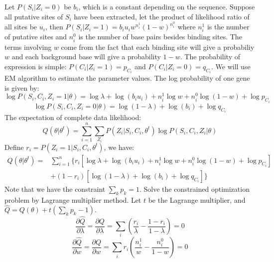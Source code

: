 \documentclass[11pt]{article}
\begin{document}
\begin{enumerate}
\begin{enumerate}
Let $P(S_i | Z_i =0)$ be $b_i$, which is a constant depending on the sequence. Suppose all putative sites of $S_i$ have been extracted, let the product of likelihood ratio of all sites be $u_i$, then $P(S_i|Z_i=1) = b_i u_i w^{n_i^1} (1 -w)^{n_i^0}$ where $n_i^1$ is the number of putative sites and $n_i^0$ is the number of base pairs besides binding sites. The terms involving $w$ come from the fact that each binding site will give a probabiliy $w$ and each background base will give a probability $1-w$. The probability of expression is simple: $P(C_i|Z_i=1) = p_{C_i}$ and  $P(C_i|Z_i=0) = q_{C_i}$. We will use EM algorithm to estimate the parameter values. The log probability of one gene is given by: 
\begin{equation}
\log P(S_i, C_i, Z_i = 1|\theta) = \log \lambda + \log(b_i u_i) + n_i^1 \log w + n_i^0 \log(1 - w) + \log p_{C_i}
\end{equation}
\begin{equation}
\log P(S_i, C_i, Z_i = 0|\theta) = \log (1-\lambda) + \log(b_i) + \log q_{C_i}
\end{equation}
The expectation of complete data likelihood: 
\begin{equation}
Q(\theta|\theta^t) = \sum_{i=1}^n \sum_{Z_i}P(Z_i|S_i,C_i,\theta^t) \log P(S_i, C_i, Z_i|\theta)
\end{equation}
Define $r_i = P(Z_i=1|S_i,C_i,\theta^t)$, we have: 
\begin{equation}
\begin{array}{ll}
Q(\theta|\theta^t) = & \sum_{i=1}^n \{ r_i [\log \lambda + \log(b_i u_i) + n_i^1 \log w + n_i^0 \log(1 - w) + \log p_{C_i}] \\
  & + (1-r_i) [\log (1-\lambda) + \log(b_i) + \log q_{C_i}] \}
\end{array}
\end{equation}
Note that we have the constraint $\sum_k p_k = 1$. Solve the constrained optimization problem by Lagrange multiplier method. Let $t$ be the Lagrange multiplier, and $\hat{Q} = Q(\theta) + t(\sum_k p_k -1)$. 
\begin{equation}
\frac{\partial \hat{Q}}{\partial \lambda} = \frac{\partial Q}{\partial \lambda} = \sum_i \left( \frac{r_i}{\lambda }- \frac{1 - r_i}{1 - \lambda} \right) = 0
\end{equation}
\begin{equation}
\frac{\partial \hat{Q}}{\partial w} = \frac{\partial Q}{\partial w} = \sum_i r_i \left( \frac{n_i^1}{w} - \frac{n_i^0}{1-w} \right) = 0
\end{equation}

\end{enumerate}
\end{enumerate}
\end{document}
